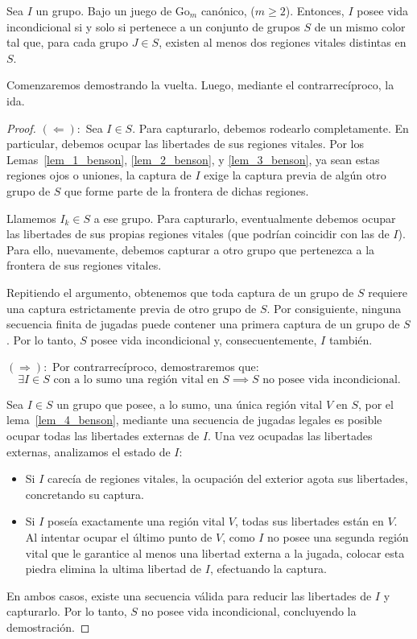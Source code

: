 \begin{theorem}\label{teo_benson}
	Sea $I$ un grupo. Bajo un juego de $\mathrm{Go}_{m}$ canónico, ($m \geq 2$). Entonces, $I$ posee vida incondicional si y solo si pertenece a un conjunto de grupos $S$ de un mismo color tal que, para cada grupo $J \in S$, existen al menos dos regiones vitales distintas en $S$.
\end{theorem}
Comenzaremos demostrando la vuelta. Luego, mediante el contrarrecíproco, la ida.
\begin{proof}
	$(\Leftarrow):$ Sea $I\in S$. Para capturarlo, debemos rodearlo completamente. En particular, debemos ocupar las libertades de sus regiones vitales. Por los Lemas~\ref{lem_1_benson}, \ref{lem_2_benson}, y \ref{lem_3_benson}, ya sean estas regiones ojos o uniones, la captura de $I$ exige la captura previa de algún otro grupo de $S$ que forme parte de la frontera de dichas regiones.
	
	Llamemos $I_k \in S$ a ese grupo. Para capturarlo, eventualmente debemos ocupar las libertades de sus propias regiones vitales (que podrían coincidir con las de $I$). Para ello, nuevamente, debemos capturar a otro grupo que pertenezca a la frontera de sus regiones vitales.
	
	Repitiendo el argumento, obtenemos que toda captura de un grupo de $S$ requiere una captura estrictamente previa de otro grupo de $S$. Por consiguiente, ninguna secuencia finita de jugadas puede contener una primera captura de un grupo de $S$. Por lo tanto, $S$ posee vida incondicional y, consecuentemente, $I$ también.
	
	$(\Rightarrow):$ Por contrarrecíproco, demostraremos que:
	$$ \exists I \in S \text{ con a lo sumo una región vital en } S \implies S \text{ no posee vida incondicional.} $$
	
	Sea $I \in S$ un grupo que posee, a lo sumo, una única región vital $V$ en $S$, por el lema~\ref{lem_4_benson}, mediante una secuencia de jugadas legales es posible ocupar todas las libertades externas de $I$. Una vez ocupadas las libertades externas, analizamos el estado de $I$:
	\begin{itemize}
		\item Si $I$ carecía de regiones vitales, la ocupación del exterior agota sus libertades, concretando su captura.
		\item Si $I$ poseía exactamente una región vital $V$, todas sus libertades están en $V$. Al intentar ocupar el último punto de $V$, como $I$ no posee una segunda región vital que le garantice al menos una libertad externa a la jugada, colocar esta piedra elimina la ultima libertad de $I$, efectuando la captura.
	\end{itemize}
	
	En ambos casos, existe una secuencia válida para reducir las libertades de $I$ y capturarlo. Por lo tanto, $S$ no posee vida incondicional, concluyendo la demostración.
\end{proof}

